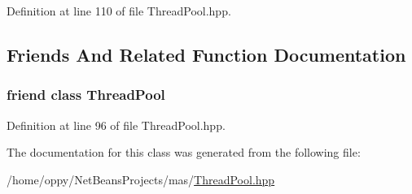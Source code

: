Definition at line 110 of file Thread\-Pool.\-hpp.



\subsection{Friends And Related Function Documentation}
\hypertarget{classmas_1_1_wait_variable_a5d97748be7d69dcc44ef551ea35ef20f}{
\subsubsection[{Thread\-Pool}]{\setlength{\rightskip}{0pt plus 5cm}friend class {\bf Thread\-Pool}\hspace{0.3cm}{\ttfamily [friend]}}}\label{classmas_1_1_wait_variable_a5d97748be7d69dcc44ef551ea35ef20f}


Definition at line 96 of file Thread\-Pool.\-hpp.



The documentation for this class was generated from the following file\-:\begin{DoxyCompactItemize}
\item 
/home/oppy/\-Net\-Beans\-Projects/mas/\hyperlink{_thread_pool_8hpp}{Thread\-Pool.\-hpp}\end{DoxyCompactItemize}
